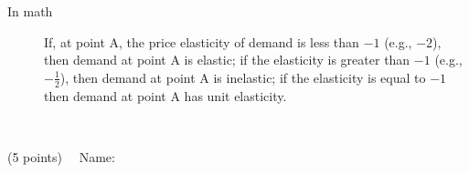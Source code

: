 \documentclass{article}
\begin{document}
\begin{EXAM}
\begin{itemize}
\begin{description}
\item [In math] If, at point A, the price elasticity of demand is less than $-1$ (e.g., $-2$), then demand at point A is elastic; if the elasticity is greater than $-1$ (e.g., $-\frac{1}{2}$), then demand at point A is inelastic; if the elasticity is equal to $-1$ then demand at point A has unit elasticity.

\end{description}


\end{itemize}

\clearpage

\ \clearpage

\vspace*{-3cm}
\begin{flushright}
(5 points) \ \ Name: \hspace*{1in}
\bigskip
\end{flushright}

\end{EXAM}
\end{document}
